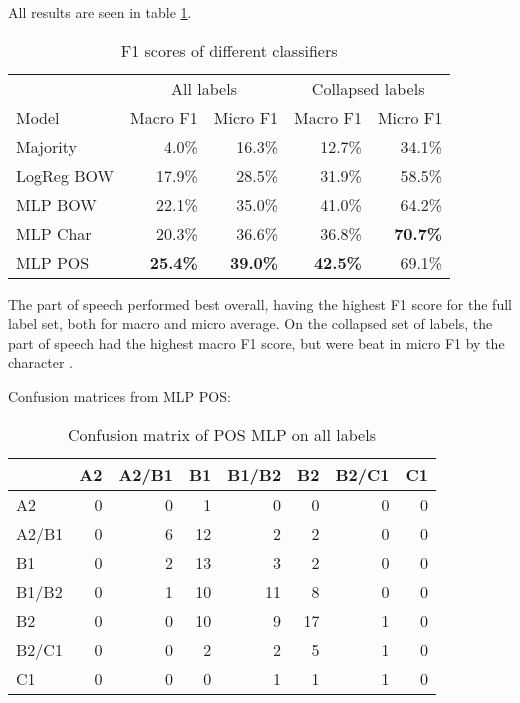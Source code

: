 All results are seen in table \ref{baseline-accuracies}.

\begin{table}
  \centering
  \begin{tabular}{|l|rr|rr|}
    \toprule
             & \multicolumn{2}{c|}{All labels} & \multicolumn{2}{c|}{Collapsed labels} \\
    Model      & Macro F1        & Micro F1        & Macro F1        & Micro F1       \\
    \midrule
    Majority   &          4.0\%  &         16.3\%  &         12.7\%  &         34.1\% \\
    LogReg BOW &         17.9\%  &         28.5\%  &         31.9\%  &         58.5\% \\
    MLP BOW    &         22.1\%  &         35.0\%  &         41.0\%  &         64.2\% \\
    MLP Char   &         20.3\%  &         36.6\%  &         36.8\%  & \textbf{70.7\%} \\
    MLP POS    & \textbf{25.4\%} & \textbf{39.0\%} & \textbf{42.5\%} &         69.1\% \\
    \bottomrule
  \end{tabular}
  \caption{F1 scores of different classifiers}
  \label{baseline-accuracies}
\end{table}

The part of speech \ngrams performed best overall, having the highest F1 score
for the full label set, both for macro and micro average. On the collapsed set
of labels, the part of speech \ngrams had the highest macro F1 score, but were
beat in micro F1 by the character \ngrams.

Confusion matrices from MLP POS:

\begin{table}
  \centering
  \begin{tabular}{|l|rrrrrrr|}
    \toprule
          & A2 & A2/B1 & B1 & B1/B2 & B2 & B2/C1 & C1 \\
    \midrule
    A2    &  0 &     0 &  1 &     0 &  0 &     0 &  0 \\
    A2/B1 &  0 &     6 & 12 &     2 &  2 &     0 &  0 \\
    B1    &  0 &     2 & 13 &     3 &  2 &     0 &  0 \\
    B1/B2 &  0 &     1 & 10 &    11 &  8 &     0 &  0 \\
    B2    &  0 &     0 & 10 &     9 & 17 &     1 &  0 \\
    B2/C1 &  0 &     0 &  2 &     2 &  5 &     1 &  0 \\
    C1    &  0 &     0 &  0 &     1 &  1 &     1 &  0 \\
    \bottomrule
  \end{tabular}
  \caption{Confusion matrix of POS MLP on all labels}
  \label{confusion-full}
\end{table}

